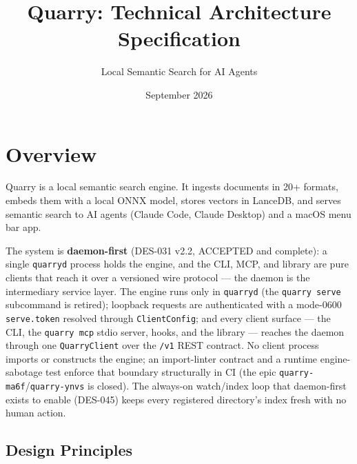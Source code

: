 \documentclass[a4paper,10pt]{article}
\begin{document}
\title{Quarry: Technical Architecture Specification}
\author{Local Semantic Search for AI Agents}
\date{September 2026}
\maketitle

\tableofcontents
\newpage

\section{Overview}

Quarry is a local semantic search engine.  It ingests documents in
20+ formats, embeds them with a local ONNX model, stores vectors in
LanceDB, and serves semantic search to AI agents (Claude Code, Claude
Desktop) and a macOS menu bar app.

The system is \textbf{daemon-first} (DES-031 v2.2, ACCEPTED and
complete): a single \texttt{quarryd} process holds the engine, and the
CLI, MCP, and library are pure clients that reach it over a versioned
wire protocol --- the daemon is the intermediary service layer.  The
engine runs only in \texttt{quarryd} (the \texttt{quarry serve}
subcommand is retired); loopback requests are authenticated with a
mode-0600 \texttt{serve.token} resolved through \texttt{ClientConfig};
and every client surface --- the CLI, the \texttt{quarry mcp} stdio
server, hooks, and the library --- reaches the daemon through one
\texttt{QuarryClient} over the \texttt{/v1} REST contract.  No client
process imports or constructs the engine; an import-linter contract and
a runtime engine-sabotage test enforce that boundary structurally in CI
(the epic \texttt{quarry-ma6f}/\texttt{quarry-ynvs} is closed).  The
always-on watch/index loop that daemon-first exists to enable (DES-045)
keeps every registered directory's index fresh with no human action.

\subsection{Design Principles}
\end{document}
